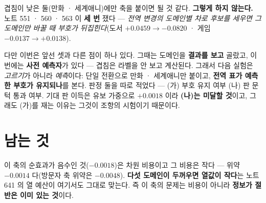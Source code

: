 \documentclass[10pt,a4paper]{article}
\begin{document}
겹침이 낮은 둘(만화 · 세계애니)에만 축을 붙이면 될 것 같다. \textbf{그렇게 하지
않는다.} 노트 551 · 560 · 563 이 \textbf{세 번} 쟀다 --- \emph{전역 변경의 도메인별
차로 후보를 세우면 그 도메인만 바꿀 때 부호가 뒤집힌다}(도서 $+0.0459 \to
\mathbf{-0.0820}$ · 게임 $-0.0137 \to \mathbf{+0.0138}$).

다만 이번은 앞선 셋과 다른 점이 하나 있다. 그때는 도메인을 \textbf{결과를 보고}
골랐고, 이번에는 \textbf{사전 예측자}가 있다 --- 겹침은 라벨을 안 보고 계산된다.
그래서 다음 실험은 \emph{고르기}가 아니라 \emph{예측}이다: 단일 전환으로 만화 ·
세계애니만 붙이고, \textbf{전역 표가 예측한 부호가 유지되나}를 본다. 판정 둘을
따로 적었다 --- (가) 부호 유지 여부 (나) 판 문턱 통과 여부. 기대 판 이득은 유보
가중으로 $+0.0018$ 이라 \textbf{(나)는 미달할 것}이고, 그래도 (가)를 재는 이유는
그것이 조항의 시험이기 때문이다.

\section{남는 것}

이 축의 순효과가 음수인 것($-0.0018$)은 차원 비용이고 그 비용은 작다 ---
위약 $-0.0014$ 다(방문자 축 위약은 $-0.0048$). \textbf{다섯 도메인이 두꺼우면
열값이 작다}는 노트 641 의 열 예산이 여기서도 그대로 맞는다. 즉 이 축의 문제는
비용이 아니라 \textbf{정보가 절반은 이미 있는 것}이다.
\end{document}

